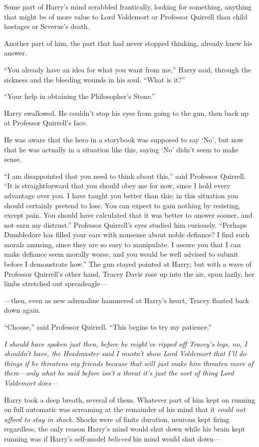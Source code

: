 Some part of Harry’s mind scrabbled frantically, looking for something, anything that might be of more value to Lord Voldemort or Professor Quirrell than child hostages or Severus’s death.

Another part of him, the part that had never stopped thinking, already knew his answer.

“You already have an idea for what you want from me,” Harry said, through the sickness and the bleeding wounds in his soul. “What is it?”

“Your help in obtaining the Philosopher’s Stone.”

Harry swallowed. He couldn’t stop his eyes from going to the gun, then back up at Professor Quirrell’s face.

He was aware that the hero in a storybook was supposed to say ‘No’, but now that he was actually in a situation like this, saying ‘No’ didn’t seem to make sense.

“I am disappointed that you need to think about this,” said Professor Quirrell. “It is straightforward that you should obey me for now, since I hold every advantage over you. I have taught you better than this; in this situation you should certainly pretend to lose. You can expect to gain nothing by resisting, except pain. You should have calculated that it was better to answer sooner, and not earn my distrust.” Professor Quirrell’s eyes studied him curiously. “Perhaps Dumbledore has filled your ears with nonsense about noble defiance? I find such morals amusing, since they are so easy to manipulate. I assure you that I can make defiance seem morally worse, and you would be well advised to submit before I demonstrate how.” The gun stayed pointed at Harry; but with a wave of Professor Quirrell’s other hand, Tracey Davis rose up into the air, spun lazily, her limbs stretched out spreadeagle—

—then, even as new adrenaline hammered at Harry’s heart, Tracey floated back down again.

“Choose,” said Professor Quirrell. “This begins to try my patience.”

\emph{I should have spoken just then, before he might’ve ripped off Tracey’s legs, no, I shouldn’t have, the Headmaster said I mustn’t show Lord Voldemort that I’ll do things if he threatens my friends because that will just make him threaten more of them—only what he said before isn’t a \emph{threat} it’s just the sort of thing Lord Voldemort \emph{does}—}

Harry took a deep breath, several of them. Whatever part of him kept on running on full automatic was screaming at the remainder of his mind that it \emph{could not afford to stay in shock.} Shocks were of finite duration, neurons kept firing regardless, the only reason Harry’s mind would shut down while his brain kept running was if Harry’s self-model \emph{believed} his mind would shut down—

